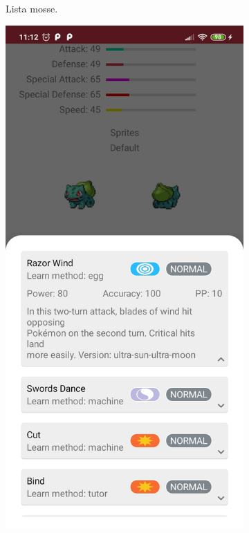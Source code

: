 \documentclass[a4paper,11pt]{article}
\begin{document}
\begin{figure}[h!]
{\begin{subfigure}[b]{0.3\linewidth}
    \caption{Lista mosse.}
  \end{subfigure}
  \begin{subfigure}[b]{0.3\linewidth}
    \includegraphics[width=\linewidth]{moves_expansion.jpg}

\end{subfigure}}
\end{figure}
\end{document}
